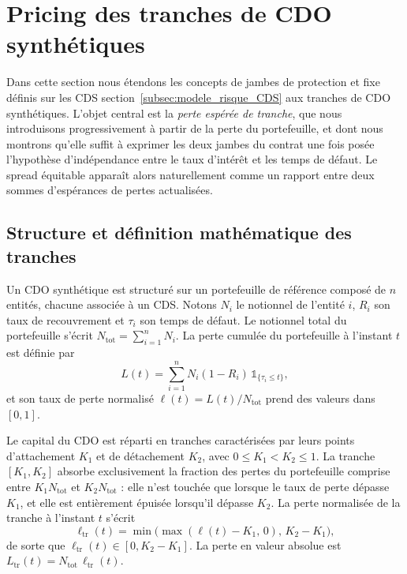 \section{Pricing des tranches de CDO synthétiques}

Dans cette section nous étendons les concepts de jambes de protection et fixe définis
sur les CDS section~\ref{subsec:modele_risque_CDS} aux tranches de CDO synthétiques.
L'objet central est la \emph{perte espérée de tranche}, que nous introduisons progressivement
à partir de la perte du portefeuille, et dont nous montrons qu'elle suffit à exprimer
les deux jambes du contrat une fois posée l'hypothèse d'indépendance entre le taux
d'intérêt et les temps de défaut. Le spread équitable apparaît alors naturellement
comme un rapport entre deux sommes d'espérances de pertes actualisées.

\subsection{Structure et définition mathématique des tranches}

Un CDO synthétique est structuré sur un portefeuille de référence composé de $n$
entités, chacune associée à un CDS. Notons $N_i$ le notionnel de l'entité $i$, $R_i$
son taux de recouvrement et $\tau_i$ son temps de défaut. Le notionnel total du
portefeuille s'écrit $N_{\text{tot}} = \sum_{i=1}^n N_i$. La perte cumulée du
portefeuille à l'instant $t$ est définie par
\begin{equation}
    L(t) = \sum_{i=1}^n N_i(1-R_i)\,\mathbb{1}_{\{\tau_i \leq t\}},
\end{equation}
et son taux de perte normalisé $\ell(t) = L(t)/N_{\text{tot}}$ prend des valeurs dans $[0, 1]$.

Le capital du CDO est réparti en tranches caractérisées par leurs points d'attachement
$K_1$ et de détachement $K_2$, avec $0 \leq K_1 < K_2 \leq 1$. La tranche $[K_1, K_2]$
absorbe exclusivement la fraction des pertes du portefeuille comprise entre
$K_1 N_{\text{tot}}$ et $K_2 N_{\text{tot}}$ : elle n'est touchée que lorsque le taux
de perte dépasse $K_1$, et elle est entièrement épuisée lorsqu'il dépasse $K_2$.
La perte normalisée de la tranche à l'instant $t$ s'écrit
\begin{equation}
    \ell_{\text{tr}}(t) = \min\!\bigl(\max(\ell(t) - K_1,\, 0),\, K_2 - K_1\bigr),
    \label{eq:perte_tranche}
\end{equation}
de sorte que $\ell_{\text{tr}}(t) \in [0, K_2 - K_1]$. La perte en valeur absolue est
$L_{\text{tr}}(t) = N_{\text{tot}}\,\ell_{\text{tr}}(t)$.

